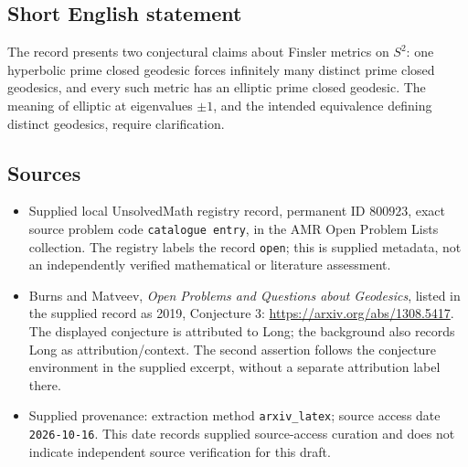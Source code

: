 \documentclass[11pt]{article}
\begin{document}
\subsection{Short English statement}
The record presents two conjectural claims about Finsler metrics on \(S^2\): one hyperbolic prime closed geodesic forces infinitely many distinct prime closed geodesics, and every such metric has an elliptic prime closed geodesic. The meaning of elliptic at eigenvalues \(\pm1\), and the intended equivalence defining distinct geodesics, require clarification.
\subsection{Sources}
\begin{itemize}
\item Supplied local UnsolvedMath registry record, permanent ID \(800923\), exact source problem code \texttt{catalogue entry}, in the AMR Open Problem Lists collection. The registry labels the record \texttt{open}; this is supplied metadata, not an independently verified mathematical or literature assessment.
\item Burns and Matveev, \emph{Open Problems and Questions about Geodesics}, listed in the supplied record as 2019, Conjecture 3: \url{https://arxiv.org/abs/1308.5417}. The displayed conjecture is attributed to Long; the background also records Long as attribution/context. The second assertion follows the conjecture environment in the supplied excerpt, without a separate attribution label there.
\item Supplied provenance: extraction method \texttt{arxiv\_latex}; source access date \texttt{2026-10-16}. This date records supplied source-access curation and does not indicate independent source verification for this draft.
\end{itemize}
\end{document}
